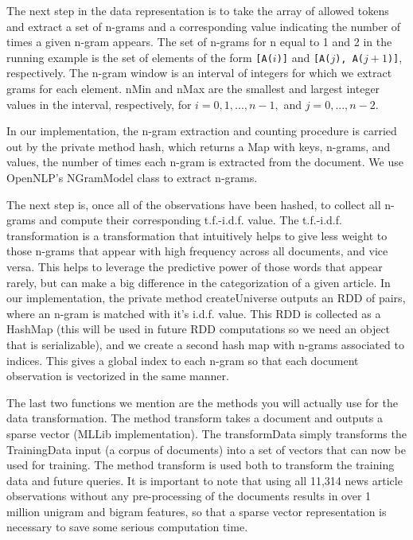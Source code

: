 \documentclass[a4paper,12pt]{article}
\renewcommand{\tt}[1]{\texttt{#1}}
\newcommand{\3}{\left}
\newcommand{\4}{\right}
\renewcommand{\-}[1]{{}^{-#1}}
\begin{document}
 The next step in the data representation is to take the array of allowed tokens and extract a set of n-grams and a corresponding value indicating the number of times a given n-gram appears. The set of n-grams for n equal to 1 and 2 in the running example is the set of elements of the form \tt{[A($i$)]} and \tt{[A($j$), A($j + 1$)]}, respectively. The n-gram window is an interval of integers for which we extract grams for each element. nMin and nMax are the smallest and largest integer values in the interval, respectively, for $i = 0, 1, ..., n - 1,$ and $j = 0, ..., n - 2.$ 

In our implementation, the n-gram extraction and counting procedure is carried out by the private method hash, which returns a Map with keys, n-grams, and values, the number of times each n-gram is extracted from the document. We use OpenNLP's NGramModel class to extract n-grams.

The next step is, once all of the observations have been hashed, to collect all n-grams and compute their corresponding t.f.-i.d.f. value. The t.f.-i.d.f. transformation is a transformation that intuitively helps to give less weight to those n-grams that appear with high frequency across all documents, and vice versa. This helps to leverage the predictive power of those words that appear rarely, but can make a big difference in the categorization of a given article. In our implementation, the private method createUniverse outputs an RDD of pairs, where an n-gram is matched with it's i.d.f. value. This RDD is collected as a HashMap (this will be used in future RDD computations so we need an object that is serializable), and we create a second hash map with n-grams associated to indices. This gives a global index to each n-gram so that each document observation is vectorized in the same manner. 

The last two functions we mention are the methods you will actually use for the data transformation. The method transform takes a document and outputs a sparse vector (MLLib implementation). The transformData simply transforms the TrainingData input (a corpus of documents) into a set of vectors that can now be used for training. The method transform is used both to transform the training data and future queries. It is important to note that using all 11,314 news article observations without any pre-processing of the documents results in over 1 million unigram and bigram features, so that a sparse vector representation is necessary to save some serious computation time.
\end{document}

